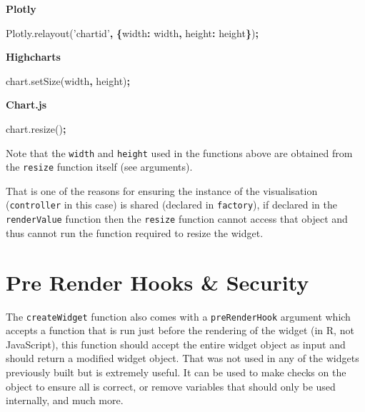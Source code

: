 \documentclass[10pt,]{krantz}
\makeatletter
\newenvironment{Shaded}{\begin{snugshade}}{\end{snugshade}}
\newcommand{\AttributeTok}[1]{\textcolor[rgb]{0.61,0.61,0.61}{#1}}
\newcommand{\DataTypeTok}[1]{\textcolor[rgb]{0.27,0.27,0.27}{#1}}
\newcommand{\NormalTok}[1]{#1}
\newcommand{\OperatorTok}[1]{\textcolor[rgb]{0.43,0.43,0.43}{\textbf{#1}}}
\newcommand{\StringTok}[1]{\textcolor[rgb]{0.5,0.5,0.5}{#1}}
\newcommand{\VariableTok}[1]{\textcolor[rgb]{0,0,0}{#1}}
\newenvironment{kframe}{%
\medskip{}
\setlength{\fboxsep}{.8em}
 \def\at@end@of@kframe{}%
 \ifinner\ifhmode%
  \def\at@end@of@kframe{\end{minipage}}%
  \begin{minipage}{\columnwidth}%
 \fi\fi%
 \def\FrameCommand##1{\hskip\@totalleftmargin \hskip-\fboxsep
 \colorbox{shadecolor}{##1}\hskip-\fboxsep
     \hskip-\linewidth \hskip-\@totalleftmargin \hskip\columnwidth}%
 \MakeFramed {\advance\hsize-\width
   \@totalleftmargin\z@ \linewidth\hsize
   \@setminipage}}%
 {\par\unskip\endMakeFramed%
 \at@end@of@kframe}
\renewenvironment{Shaded}{\begin{kframe}}{\end{kframe}}
\makeatother
\begin{document}
\textbf{Plotly}

\begin{Shaded}
\begin{Highlighting}[]
\VariableTok{Plotly}\NormalTok{.}\AttributeTok{relayout}\NormalTok{(}\StringTok{'chartid'}\OperatorTok{,} \OperatorTok{\{}\DataTypeTok{width}\OperatorTok{:}\NormalTok{ width}\OperatorTok{,} \DataTypeTok{height}\OperatorTok{:}\NormalTok{ height}\OperatorTok{\}}\NormalTok{)}\OperatorTok{;}
\end{Highlighting}
\end{Shaded}

\textbf{Highcharts}

\begin{Shaded}
\begin{Highlighting}[]
\VariableTok{chart}\NormalTok{.}\AttributeTok{setSize}\NormalTok{(width}\OperatorTok{,}\NormalTok{ height)}\OperatorTok{;}
\end{Highlighting}
\end{Shaded}

\textbf{Chart.js}

\begin{Shaded}
\begin{Highlighting}[]
\VariableTok{chart}\NormalTok{.}\AttributeTok{resize}\NormalTok{()}\OperatorTok{;}
\end{Highlighting}
\end{Shaded}

Note that the \texttt{width} and \texttt{height} used in the functions above are obtained from the \texttt{resize} function itself (see arguments).

That is one of the reasons for ensuring the instance of the visualisation (\texttt{controller} in this case) is shared (declared in \texttt{factory}), if declared in the \texttt{renderValue} function then the \texttt{resize} function cannot access that object and thus cannot run the function required to resize the widget.

\hypertarget{widgets-adv-prerender}{%
\section{Pre Render Hooks \& Security}\label{widgets-adv-prerender}}

The \texttt{createWidget} function also comes with a \texttt{preRenderHook} argument which accepts a function that is run just before the rendering of the widget (in R, not JavaScript), this function should accept the entire widget object as input and should return a modified widget object. That was not used in any of the widgets previously built but is extremely useful. It can be used to make checks on the object to ensure all is correct, or remove variables that should only be used internally, and much more.
\end{document}
